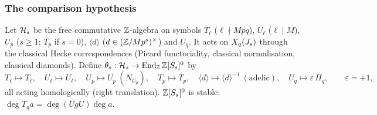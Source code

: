 \subsubsection{The comparison hypothesis}
\begin{definition}\label{def:s05-theta}
Let $\mathcal{H}_s$ be the free commutative $\mathbb{Z}$-algebra on symbols $T_\ell$ ($\ell\nmid Mpq$), $U_\ell$ ($\ell\mid M$), $U_p$ ($s\ge1$;
$T_p$ if $s=0$), $\langle d\rangle$ ($d\in(\mathbb{Z}/Mp^s)^\times$) and $U_q$. It acts on $X_q(J_s)$ through the classical Hecke
correspondences (Picard functoriality, classical normalisation, classical diamonds). Define
$\theta_s:\mathcal{H}_s\to\operatorname{End}_{\mathbb{Z}}\mathbb{Z}[S_s]^0$ by
\[T_\ell\mapsto T_\ell,\quad U_\ell\mapsto U_\ell,\quad U_p\mapsto U_p\ (N_{U_p}),\quad T_p\mapsto T_p,\quad
\langle d\rangle\mapsto\langle d\rangle^{-1}\ (\text{adelic}),\quad U_q\mapsto\varepsilon\,\Pi_q,\qquad \varepsilon=+1,\]
all acting homologically (right translation). $\mathbb{Z}[S_s]^0$ is stable: $\deg T_g a=\deg(UgU)\deg a$.
\end{definition}

